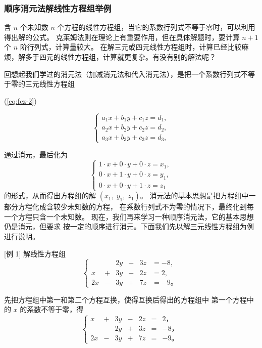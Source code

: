 \subsubsection{顺序消元法解线性方程组举例}

含 $n$ 个未知数 $n$ 个方程的线性方程组，当它的系数行列式不等于零时，可以利用得出解的公式。
克莱姆法则在理论上有重要作用，但在具体解题时，要计算 $n+1$ 个 $n$ 阶行列式，计算量较大。
在解三元或四元线性方程组时，计算已经比较麻烦，解多于四元的线性方程组，计算就更复杂。有没有别的解法呢？

回想起我们学过的消元法（加减消元法和代入消元法），是把一个系数行列式不等于零的三元线性方程组

(\ref{eq:fcz-2})
\begin{minipage}[c]{0.90\textwidth}
    $$\begin{cases}
        a_1 x + b_1 y + c_1 z = d_1 , \\
        a_2 x + b_2 y + c_2 z = d_2 , \\
        a_3 x + b_3 y + c_3 z = d_3 ,
    \end{cases}$$
\end{minipage}
通过消元，最后化为
$$
\begin{cases}
    1 \cdot x + 0 \cdot y + 0 \cdot z = x_1 , \\
    0 \cdot x + 1 \cdot y + 0 \cdot z = y_1 , \\
    0 \cdot x + 0 \cdot y + 1 \cdot z = z_1
\end{cases}
$$
的形式，从而得出方程组的解 $(x_1,\; y_1,\; z_1)$。
消元法的基本思想是把方程组中一部分方程化成含较少未知数的方程，
在系数行列式不为零的情况下，最终化到每一个方程只含一个未知数。
现在，我们再来学习一种顺序消元法，它的基本思想仍是消元，但要求
按一定的顺序进行消元。下面我们先以解三元线性方程组为例进行说明。

\liti{}[例 1] 解线性方程组
$$\left\{
    \begin{alignedat}{3}
           &     & 2y & +{} & 3z & = -8, \\
        x  & +{} & 3y & -{} & 2z & = 2, \\
        2x & -{} & 3y & +{} & 7z & = -9 \text{。}
    \end{alignedat}
\right.$$

\jie 先把方程组中第一和第二个方程互换，使得互换后得出的方程组中
第一个方程中的 $x$ 的系数不等于零，得
$$\left\{
    \begin{alignedat}{4}
        x  & +{} & 3y & -{} & 2z & ={} & 2 \text{，} \\
           &     & 2y & +{} & 3z & ={} & -8 \text{，} \\
        2x & -{} & 3y & +{} & 7z & ={} & -9 \text{。}
    \end{alignedat}
\right.$$

